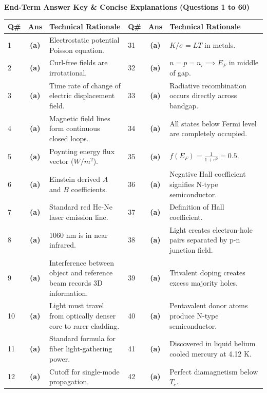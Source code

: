 \vspace{4mm}
\begin{center}
{\small\textbf{End-Term Answer Key \& Concise Explanations (Questions 1 to 60)}}
\vspace{2mm}
\footnotesize
\begin{tabularx}{\textwidth}{l c X l c X}
\toprule
\textbf{Q\#} & \textbf{Ans} & \textbf{Technical Rationale} & \textbf{Q\#} & \textbf{Ans} & \textbf{Technical Rationale} \\
\midrule
1 & \textbf{(a)} & Electrostatic potential Poisson equation. & 31 & \textbf{(a)} & $K/\sigma = L T$ in metals. \\
2 & \textbf{(a)} & Curl-free fields are irrotational. & 32 & \textbf{(a)} & $n = p = n_i \implies E_F$ in middle of gap. \\
3 & \textbf{(a)} & Time rate of change of electric displacement field. & 33 & \textbf{(a)} & Radiative recombination occurs directly across bandgap. \\
4 & \textbf{(a)} & Magnetic field lines form continuous closed loops. & 34 & \textbf{(a)} & All states below Fermi level are completely occupied. \\
5 & \textbf{(a)} & Poynting energy flux vector ($W/m^2$). & 35 & \textbf{(a)} & $f(E_F) = \frac{1}{1 + e^0} = 0.5$. \\
6 & \textbf{(a)} & Einstein derived $A$ and $B$ coefficients. & 36 & \textbf{(a)} & Negative Hall coefficient signifies N-type semiconductor. \\
7 & \textbf{(a)} & Standard red He-Ne laser emission line. & 37 & \textbf{(a)} & Definition of Hall coefficient. \\
8 & \textbf{(a)} & 1060 nm is in near infrared. & 38 & \textbf{(a)} & Light creates electron-hole pairs separated by p-n junction field. \\
9 & \textbf{(a)} & Interference between object and reference beam records 3D information. & 39 & \textbf{(a)} & Trivalent doping creates excess majority holes. \\
10 & \textbf{(a)} & Light must travel from optically denser core to rarer cladding. & 40 & \textbf{(a)} & Pentavalent donor atoms produce N-type semiconductor. \\
11 & \textbf{(a)} & Standard formula for fiber light-gathering power. & 41 & \textbf{(a)} & Discovered in liquid helium cooled mercury at 4.12 K. \\
12 & \textbf{(a)} & Cutoff for single-mode propagation. & 42 & \textbf{(a)} & Perfect diamagnetism below $T_c$. \\

\end{tabularx}
\end{center}
